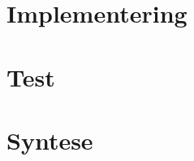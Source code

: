 


\chapter{Implementering}

\chapter{Test}

\chapter{Syntese}
%
%
%
\begingroup
\raggedright



%
%

\endgroup

\appendix


